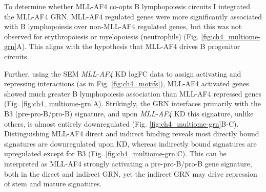 To determine whether MLL-AF4 co-opts B lymphopoiesis circuits I integrated the MLL-AF4 GRN. MLL-AF4 regulated genes were more significantly associated with B lymphopoiesis over non-MLL-AF4 regulated genes, but this was not observed for erythropoiesis or myelopoiesis (neutrophils) (Fig. \ref{fig:ch4_multiome-grn}A). This aligns with the hypothesis that MLL-AF4 drives B progenitor circuits. 

Further, using the SEM \textit{MLL-AF4} KD logFC data to assign activating and repressing interactions (as in Fig. \ref{fig:ch4_motifs}), MLL-AF4 activated genes showed much greater B lymphopoiesis association than MLL-AF4 repressed genes (Fig. \ref{fig:ch4_multiome-grn}A). Strikingly, the GRN interfaces primarily with the B3 (pre-pro-B/pro-B) signature, and upon \textit{MLL-AF4} KD this signature, unlike others, is almost entirely downregulated (Fig. \ref{fig:ch4_multiome-grn}B-C). Distinguishing MLL-AF4 direct and indirect binding reveals most directly bound signatures are downregulated upon KD, whereas indirectly bound signatures are upregulated except for B3 (Fig. \ref{fig:ch4_multiome-grn}C). This can be interpreted as MLL-AF4 strongly activating a pre-pro-B/pro-B gene signature, both in the direct and indirect GRN, yet the indirect GRN may drive repression of stem and mature signatures. 

